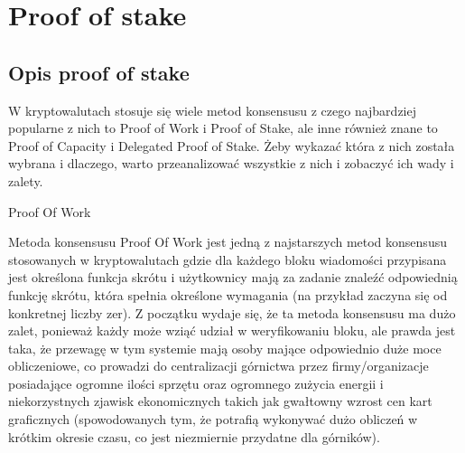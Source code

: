 \section{Proof of stake}
\label{sec:POS}
\subsection{Opis proof of stake}
\label{sec:POSOpis}
W kryptowalutach stosuje się wiele metod konsensusu z czego najbardziej popularne z nich to Proof of Work i Proof of Stake, ale inne również znane to Proof of Capacity i Delegated Proof of Stake. Żeby wykazać która z nich została wybrana i dlaczego, warto przeanalizować wszystkie z nich i zobaczyć ich wady i zalety.

\vspace{1em}

Proof Of Work

\vspace{1em}

Metoda konsensusu Proof Of Work jest jedną z najstarszych metod konsensusu stosowanych w kryptowalutach gdzie dla każdego bloku wiadomości przypisana jest określona funkcja skrótu i użytkownicy mają za zadanie znaleźć odpowiednią funkcję skrótu, która spełnia określone wymagania (na przykład zaczyna się od konkretnej liczby zer). Z początku wydaje się, że ta metoda konsensusu ma dużo zalet, ponieważ każdy może wziąć udział w weryfikowaniu bloku, ale prawda jest taka, że przewagę w tym systemie mają osoby mające odpowiednio duże moce obliczeniowe, co prowadzi do centralizacji górnictwa przez firmy/organizacje posiadające ogromne ilości sprzętu oraz ogromnego zużycia energii i niekorzystnych zjawisk ekonomicznych takich jak gwałtowny wzrost cen kart graficznych (spowodowanych tym, że potrafią wykonywać dużo obliczeń w krótkim okresie czasu, co jest niezmiernie przydatne dla górników).

\vspace{1em}

